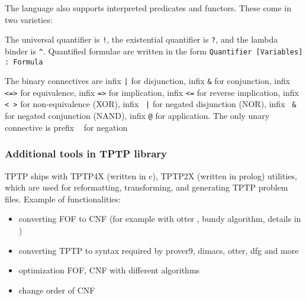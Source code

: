 The language also supports interpreted predicates and functors. These come in two varieties: 

The universal quantifier is \texttt{!}, the existential quantifier is \texttt{?}, and the lambda binder is \texttt{^}. Quantified formulae are written in the form \texttt{Quantifier [Variables] :  Formula}

The binary connectives are infix \texttt{|} for disjunction, infix \texttt{&} for conjunction, infix \texttt{<=>} for equivalence, infix \texttt{=>} for implication, infix \texttt{<=} for reverse implication, infix \texttt{<~>} for non-equivalence (XOR), infix \texttt{~|} for negated disjunction (NOR), infix	\texttt{~&} for negated conjunction (NAND), infix \texttt{@} for application. The only unary connective is prefix \texttt{~} for negation

\subsubsection{Additional tools in TPTP library}
\label{sub:AdditionalToolsInTPTPLibrary}

TPTP ships with \gls{TPTP4X} (written in c), \gls{TPTP2X} (written in prolog) utilities, which are used for reformatting, transforming, and generating TPTP problem files. Example of functionalities:

\begin{itemize}
  \item converting \gls{FOF} to \gls{CNF} (for example with otter \cite{McC-Otter-URL}, bundy \cite{Bun83} algorithm, details in \cite{SM96})
  \item converting TPTP to syntax required by prover9, dimacs, otter, dfg and more
  \item optimization \gls{FOF}, \gls{CNF} with different algorithms
  \item change order of \gls{CNF}
\end{itemize}

